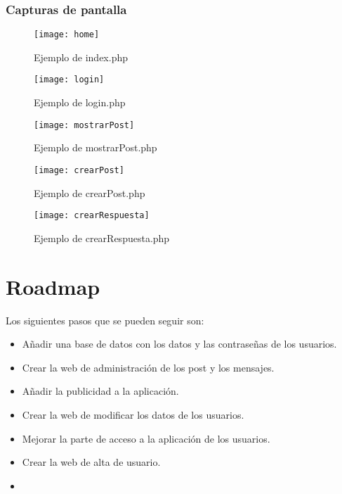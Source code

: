 \documentclass[a4paper]{article}
\begin{document}
	\subsubsection{Capturas de pantalla}
	\begin{figure}[htb]
		\texttt{[image: home]}
		\caption{Ejemplo de index.php}
		\label{}
	\end{figure}
	\begin{figure}[htb]
		\texttt{[image: login]}
		\caption{Ejemplo de login.php}
		\label{}
	\end{figure}
	\begin{figure}[htb]
		\texttt{[image: mostrarPost]}
		\caption{Ejemplo de mostrarPost.php}
		\label{}
	\end{figure}
	\begin{figure}[htb]
		\texttt{[image: crearPost]}
		\caption{Ejemplo de crearPost.php}
		\label{}
	\end{figure}
	\begin{figure}[htb]
		\texttt{[image: crearRespuesta]}
		\caption{Ejemplo de crearRespuesta.php}
		\label{}
	\end{figure}
	
	\section{Roadmap}\label{mejoras}
	Los siguientes pasos que se pueden seguir son:
	\begin{itemize}
		\item Añadir una base de datos con los datos y las contraseñas de los usuarios.
		\item Crear la web de administración de los post y los mensajes.
		\item Añadir la publicidad a la aplicación.
		\item Crear la web de modificar los datos de los usuarios.
		\item Mejorar la parte de acceso a la aplicación de los usuarios.
		\item Crear la web de alta de usuario.
		\item 
	\end{itemize}
	
\end{document}
